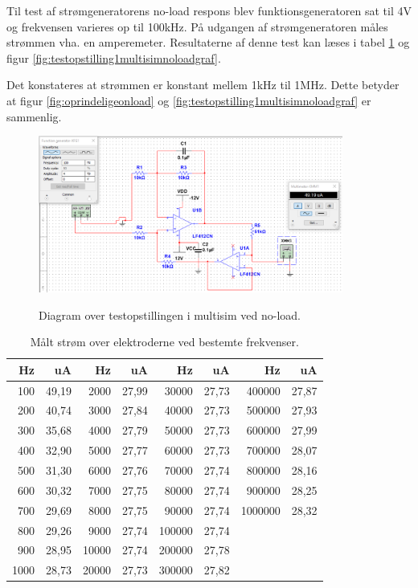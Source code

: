 Til test af strømgeneratorens no-load respons blev funktionsgeneratoren sat til 4V og frekvensen varieres op til 100kHz. På udgangen af strømgeneratoren måles strømmen vha. en amperemeter. Resultaterne af denne test kan læses i tabel \ref{table:frekvensernoload} og figur \ref{fig:testopstilling1multisimnoloadgraf}.

Det konstateres at strømmen er konstant mellem 1kHz til 1MHz. Dette betyder at figur \ref{fig:oprindeligeonload} og  \ref{fig:testopstilling1multisimnoloadgraf} er sammenlig.   

\begin{figure}[H]
\centering
{\includegraphics[width=10cm]
{Figure/testopstilling1multisimnoload}}
\caption{Diagram over testopstillingen i multisim ved no-load. }
\label{fig:testopstilling1multisimnoload}
\end{figure}


\begin{table}[H]
\centering
\begin{tabular}{| r | r || r | r || r | r || r | r |}
    \hline
    \textbf{Hz} & \textbf{uA} & \textbf{Hz} & \textbf{uA} & \textbf{Hz} & \textbf{uA} & \textbf{Hz} & \textbf{uA}\\ \hline
    100 & 49,19 & 2000 & 27,99 & 30000 & 27,73 & 400000 & 27,87  \\ \hline
    200 & 40,74 & 3000 & 27,84 & 40000 & 27,73 & 500000 & 27,93  \\ \hline
    300 & 35,68 & 4000 & 27,79 & 50000 & 27,73 & 600000 & 27,99  \\ \hline
    400 & 32,90 & 5000 & 27,77 & 60000 & 27,73 & 700000 & 28,07  \\ \hline
    500 & 31,30 & 6000 & 27,76 & 70000 & 27,74 & 800000 & 28,16  \\ \hline
    600 & 30,32 & 7000 & 27,75 & 80000 & 27,74 & 900000 & 28,25  \\ \hline
    700 & 29,69 & 8000 & 27,75 & 90000 & 27,74 & 1000000 & 28,32  \\ \hline
    800 & 29,26 & 9000 & 27,74 & 100000 & 27,74 &  &   \\ \hline
    900 & 28,95 & 10000 & 27,74 & 200000 & 27,78 &  &   \\ \hline
    1000 & 28,73 & 20000 & 27,73 & 300000 & 27,82 &  &  \\ \hline
\end{tabular}
    \caption{Målt strøm over elektroderne ved bestemte frekvenser.}
    \label{table:frekvensernoload}
\end{table} 


